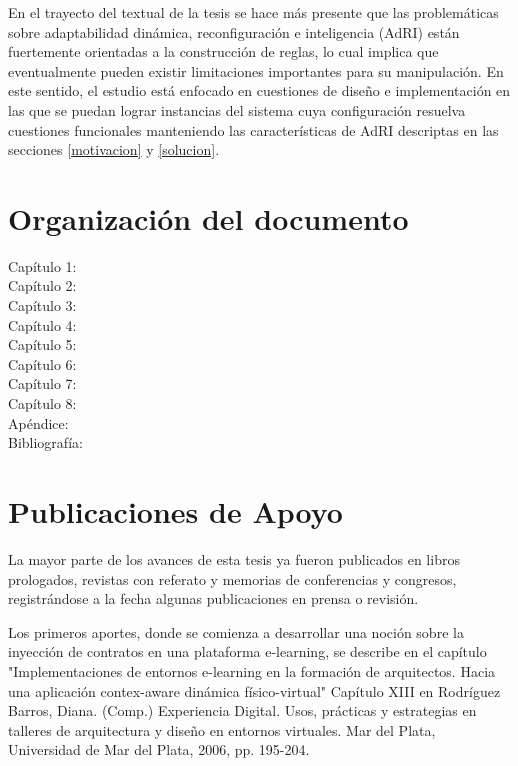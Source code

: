 {En el trayecto del textual de la tesis se hace más presente que las problemáticas sobre adaptabilidad dinámica, reconfiguración e inteligencia
(AdRI) están fuertemente orientadas a la construcción de reglas, lo cual
implica que eventualmente pueden existir limitaciones importantes para su
manipulación. En este sentido, el estudio está enfocado en cuestiones de
diseño e implementación en las que se puedan lograr instancias del sistema
cuya configuración resuelva cuestiones funcionales manteniendo las
características de AdRI descriptas en las secciones \ref{motivacion}
y \ref{solucion}.


\section{Organización del documento}

\begin{description}
 \item[Capítulo 1:]
 \item[Capítulo 2:]
 \item[Capítulo 3:]
 \item[Capítulo 4:]
 \item[Capítulo 5:]
 \item[Capítulo 6:]
 \item[Capítulo 7:]
 \item[Capítulo 8:]
 \item[Apéndice:]
 \item[Bibliografía:]
\end{description}


\section{Publicaciones de Apoyo}

La mayor parte de los avances de esta tesis ya fueron publicados en
libros prologados, revistas con referato y memorias de conferencias y
congresos, registrándose a la fecha algunas publicaciones en prensa o revisión.

Los primeros aportes, donde se comienza a desarrollar una noción
sobre la inyección de contratos en una plataforma e-learning, se describe en
el capítulo "Implementaciones de entornos e-learning en la formación de
arquitectos. Hacia una aplicación contex-aware dinámica físico-virtual" Capítulo
XIII en Rodríguez Barros, Diana. (Comp.) Experiencia Digital. Usos, prácticas y
estrategias en talleres de arquitectura y diseño en entornos virtuales. Mar del
Plata, Universidad de Mar del Plata, 2006, pp. 195-204.

}
